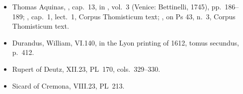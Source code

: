 {\begin{itemize}[leftmargin=1.2em,itemsep=.15em]
on 1:3, PG~82.
\item Thomas Aquinas, , cap.~13, in
, vol.~3 (Venice: Bettinelli, 1745), pp.~186--189;
, cap.~1, lect.~1, Corpus
Thomisticum text; , on Ps 43, n.~3, Corpus Thomisticum
text.
\item Durandus, William,  VI.140, in the
Lyon printing of 1612, tomus secundus, p.~412.
\item Rupert of Deutz,  XII.23, PL~170,
cols.~329--330.
\item Sicard of Cremona,  VIII.23, PL~213.
\end{itemize}
\par}
